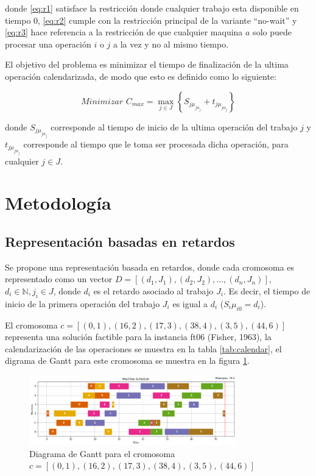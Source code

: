 \documentclass[12pt,a4paper]{article}
\begin{document}
    donde \ref{eq:r1} satisface la restricción donde cualquier trabajo esta disponible en tiempo 0, \ref{eq:r2} cumple con la restricción principal de la variante ``no-wait'' y \ref{eq:r3} hace referencia a la restricción de que cualquier maquina $a$ solo puede procesar una operación $i$ o $j$ a la vez y no al mismo tiempo.
    
    El objetivo del problema es minimizar el tiempo de finalización de la ultima operación calendarizada, de modo que esto es definido como lo siguiente: 
    
    \begin{equation}
        \textit{Minimizar } C_{max} = \max_{j \in J} \left\{ S_{j\mu_{jn_j}} + t_{j\mu_{jn_j}} \right\} 
    \end{equation}
    
    donde $S_{j\mu_{jn_j}}$ corresponde al tiempo de inicio de la ultima operación del trabajo $j$ y $t_{j\mu_{jn_j}}$ corresponde al tiempo que le toma ser procesada dicha operación, para cualquier $j \in J$.
\section{Metodología}

\subsection{Representación basadas en retardos}

Se propone una representación basada en retardos, donde cada cromosoma es representado como un vector $D = [(d_1, J_1), (d_2, J_2), \ldots, (d_n, J_n)]$, $d_i \in \mathbb{N} , j_i \in J$, donde $d_i$ es el retardo asociado al trabajo $J_i$. Es decir, el tiempo de inicio de la primera operación del trabajo $J_i$ es igual a $d_i$ ($S_i\mu_{i0} = d_i$). 

El cromosoma $c = [(0, 1), (16, 2), (17, 3), (38, 4), (3, 5), (44, 6)]$ representa una solución factible para la instancia ft06 (Fisher, 1963)\cite{ft}, la calendarización de las operaciones se muestra en la tabla \ref{tab:calendar}, el digrama de Gantt para este cromosoma se muestra en la figura \ref{fig:gant1}.

\begin{figure}[H]
    \centering
    \includegraphics[width=0.8\textwidth]{Figure/gant1.png}
    \caption{Diagrama de Gantt para el cromosoma $c = [(0, 1), (16, 2), (17, 3), (38, 4), (3, 5), (44, 6)]$}
    \label{fig:gant1}
\end{figure}
\end{document}
